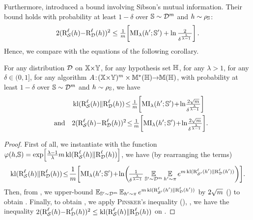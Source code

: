 \begin{noaddcontents}
Furthermore, \citet[Cor.4]{EspositoGastparIssa2020}  introduced a bound involving Sibson's mutual information.
Their bound holds with probability at least $1{-}\delta$ over $\mathbb{S}\sim\mathcal{D}^m$ and $h\sim\rho_{\mathbb{S}}$:
\begin{align}
2(\text{R}^{\ell}_{\mathcal{S}}(h){-}\text{R}^{\ell}_{\mathcal{D}}(h))^2\le \tfrac{1}{m}\!\left[ \operatorname{MI}_{\lambda}(h'; \mathbb{S}') + \ln \tfrac{2}{\delta^{\frac{\lambda}{\lambda{-}1}}}\right].\label{chap:dis-pra:eq:esposito}
\end{align}
Hence, we compare  with the equations of the following corollary.
\begin{corollary}
For any distribution $\mathcal{D}$ on $\mathbb{X}{\times}\mathbb{Y}$, for any hypothesis set $\mathbb{H}$, for any $\lambda\!>\!1$, for any $\delta\in(0,1]$, for any algorithm $A\!:\!(\mathbb{X}{\times}\mathbb{Y})^{m}\times\mathbb{M}^{*}(\mathbb{H}){\rightarrow} \mathbb{M}(\mathbb{H})$, with probability at least $1{-}\delta$ over $\mathbb{S}\sim\mathcal{D}^m$ and $h\sim\rho_{\mathbb{S}}$, we have
\begin{align}
   & \kl(\RiskLoss_{\dS}(\h)\|\RiskLoss_{\D}(\h))\! 
    \le \! \tfrac{1}{\m}\!\LB \MI_{\lambda}(\h'; \S')\! +\! \ln\! \tfrac{2\sqrt{\m}}{\delta^{\frac{\lambda}{\lambda{-}1}}} \RB\label{chap:dis-pra:eq:mutual-info-seeger}\\
   \text{\quad and\quad}
    & 2(\RiskLoss_{\dS}(\h){-}\RiskLoss_{\D}(\h))^2\! \le\! \tfrac{1}{\m}\!\LB \MI_{\lambda}(\h'; \S')\! +\! \ln\! \tfrac{2\sqrt{\m}}{\delta^{\frac{\lambda}{\lambda{-}1}}}\RB\label{chap:dis-pra:eq:mutual-info-mcallester}\!.
\end{align}
\label{chap:dis-pra:corollary:mutual-info-seeger-mcallester}
\end{corollary}
\begin{proof}
First of all, we instantiate  with the function $\varphi(h,\!\mathbb{S})=\exp\!\left[\tfrac{\lambda-1}{\lambda}m\operatorname{kl}(\text{R}^{\ell}_{\mathcal{S}}(h)\|\text{R}^{\ell}_{\mathcal{D}}(h))\right]$, we have (by rearranging the terms)
\begin{align*}
    \kl(\RiskLoss_{\dS}(\h)\|\RiskLoss_{\D}(\h))\! 
    \le \! \frac{1}{\m}\!\LB \MI_{\lambda}(\h'; \S')\! +\! \ln\!\LP\! \tfrac{1}{\delta^{\frac{\lambda}{\lambda{-}1}}}\EE_{\S'{\sim}\D^\m}\EE_{\h'{\sim}\P}e^{\m\kl(\RiskLoss_{\dSp}(\h')\|\RiskLoss_{\D}(\h'))}\RP \RB\!.
\end{align*}
Then, from \citet{Maurer2004}, we upper-bound  $\operatorname*{\mathbb{E}}_{\mathbb{S}'{\sim}\mathcal{D}^m}\operatorname*{\mathbb{E}}_{h'{\sim}\pi} e^{m\operatorname{kl}(\text{R}^{\ell}_{\mathcal{S}'}(h')\|\text{R}^{\ell}_{\mathcal{D}}(h'))}$ by $2\sqrt{m}$ () to obtain .
Finally, to obtain , we apply \textsc{Pinsker}'s inequality (), \ie, we have the inequality $2(\text{R}^{\ell}_{\mathcal{S}}(h){-}\text{R}^{\ell}_{\mathcal{D}}(h))^2\le \operatorname{kl}(\text{R}^{\ell}_{\mathcal{S}}(h)\|\text{R}^{\ell}_{\mathcal{D}}(h))$ on .

\end{proof}
\end{noaddcontents}
